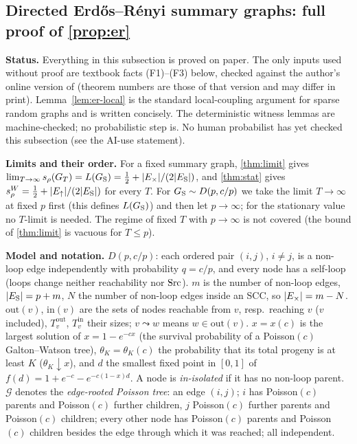 \subsection{Directed Erd\H{o}s--R\'enyi summary graphs: full proof of \cref{prop:er}}
\label{app:erproof}

\textbf{Status.} Everything in this subsection is proved on paper. The only
inputs used without proof are textbook facts (F1)--(F3) below, checked against
the author's online version of \citet{hofstad2016random} (theorem numbers are
those of that version and may differ in print). Lemma~\ref{lem:er-local} is the
standard local-coupling argument for sparse random graphs and is written
concisely. The deterministic witness lemmas are machine-checked; no
probabilistic step is. No human probabilist has yet checked this subsection
(see the AI-use statement).

\textbf{Limits and their order.} For a fixed summary graph, \cref{thm:limit}
gives $\lim_{T\to\infty}s_\rho(G_T)=L(G_{\mathrm S})=\tfrac12+|E_{\times}|/(2|E_{\mathrm S}|)$, and
\cref{thm:stat} gives $s_\rho^W=\tfrac12+|E_{\uparrow}|/(2|E_{\mathrm S}|)$ for every $T$. For
$G_{\mathrm S}\sim D(p,c/p)$ we take the limit $T\to\infty$ at fixed $p$ first (this
defines $L(G_{\mathrm S})$) and then let $p\to\infty$; for the stationary value no
$T$-limit is needed. The regime of fixed $T$ with $p\to\infty$ is not covered
(the bound of \cref{thm:limit} is vacuous for $T\le p$).

\textbf{Model and notation.} $D(p,c/p)$: each ordered pair $(i,j)$, $i\ne j$,
is a non-loop edge independently with probability $q=c/p$, and every node has
a self-loop (loops change neither reachability nor $\mathrm{Src}$). $m$ is the number of
non-loop edges, $|E_{\mathrm S}|=p+m$, $N$ the number of non-loop edges inside an SCC, so
$|E_{\times}|=m-N$. $\mathrm{out}(v)$, $\mathrm{in}(v)$ are the sets of nodes
reachable from $v$, resp.\ reaching $v$ ($v$ included), $T^{\mathrm{out}}_v$,
$T^{\mathrm{in}}_v$ their sizes; $v\leadsto w$ means $w\in\mathrm{out}(v)$.
$x=x(c)$ is the largest solution of $x=1-e^{-cx}$ (the survival probability of
a Poisson$(c)$ Galton--Watson tree), $\theta_K=\theta_K(c)$ the probability that
its total progeny is at least $K$ ($\theta_K\downarrow x$), and $d$ the smallest
fixed point in $[0,1]$ of $f(d)=1+e^{-c}-e^{-c(1-x)d}$. A node is
\emph{in-isolated} if it has no non-loop parent. $\mathcal G$ denotes the
\emph{edge-rooted Poisson tree}: an edge $(i,j)$; $i$ has Poisson$(c)$ parents
and Poisson$(c)$ further children, $j$ Poisson$(c)$ further parents and
Poisson$(c)$ children; every other node has Poisson$(c)$ parents and
Poisson$(c)$ children besides the edge through which it was reached; all
independent.

